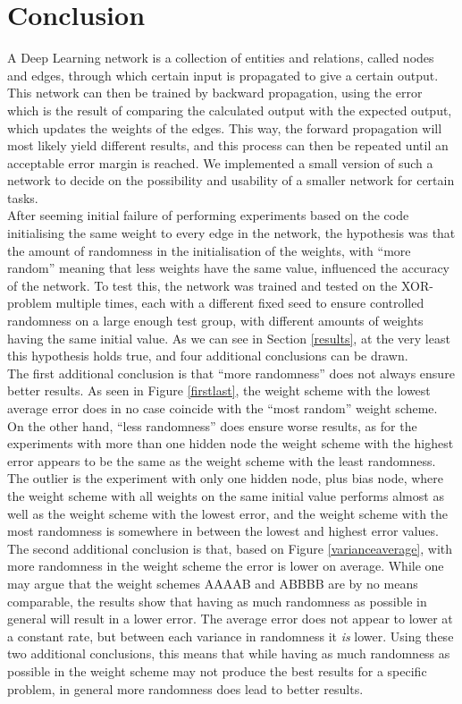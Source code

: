 \documentclass[a4paper, 10pt, notitlepage, twocolumn]{article}
\begin{document}
\FloatBarrier
  
 \section{Conclusion}
 \label{conclusion}
  A Deep Learning network is a collection of entities and relations, called nodes and edges, through which certain input is propagated to give a certain output. This network can then be trained by backward propagation, using the error which is the result of comparing the calculated output with the expected output, which updates the weights of the edges. This way, the forward propagation will most likely yield different results, and this process can then be repeated until an acceptable error margin is reached. We implemented a small version of such a network to decide on the possibility and usability of a smaller network for certain tasks.\\
	 After seeming initial failure of performing experiments based on the code initialising the same weight to every edge in the network, the hypothesis was that the amount of randomness in the initialisation of the weights, with ``more random'' meaning that less weights have the same value, influenced the accuracy of the network. To test this, the network was trained and tested on the XOR-problem multiple times, each with a different fixed seed to ensure controlled randomness on a large enough test group, with different amounts of weights having the same initial value. As we can see in Section \ref{results}, at the very least this hypothesis holds true, and four additional conclusions can be drawn.\\
	 The first additional conclusion is that ``more randomness'' does not always ensure better results. As seen in Figure \ref{firstlast}, the weight scheme with the lowest average error does in no case coincide with the ``most random'' weight scheme. On the other hand, ``less randomness'' does ensure worse results, as for the experiments with more than one hidden node the weight scheme with the highest error appears to be the same as the weight scheme with the least randomness. The outlier is the experiment with only one hidden node, plus bias node, where the weight scheme with all weights on the same initial value performs almost as well as the weight scheme with the lowest error, and the weight scheme with the most randomness is somewhere in between the lowest and highest error values.\\
	 The second additional conclusion is that, based on Figure \ref{varianceaverage}, with more randomness in the weight scheme the error is lower on average. While one may argue that the weight schemes AAAAB and ABBBB are by no means comparable, the results show that having as much randomness as possible in general will result in a lower error. The average error does not appear to lower at a constant rate, but between each variance in randomness it \emph{is} lower. Using these two additional conclusions, this means that while having as much randomness as possible in the weight scheme may not produce the best results for a specific problem, in general more randomness does lead to better results.\\
\end{document}
